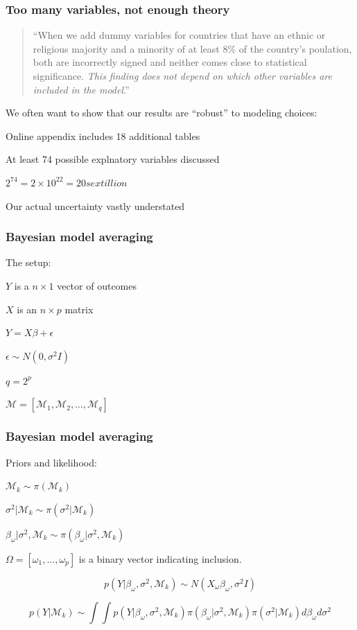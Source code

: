 \documentclass[xcolor=dvipsnames]{beamer}
\begin{document}
\begin{frame}
\frametitle{Too many variables, not enough theory}

\begin{quote}
``When we add dummy variables for countries that have
an ethnic or religious majority and a minority of at least
8\% of the country’s poulation, both are incorrectly signed
and neither comes close to statistical significance. \textit{This
finding does not depend on which other variables are included
in the model}.''
\end{quote}

\vp
We often want to show that our results are ``robust'' to modeling
choices:
\pause
\bis
\item Online appendix includes 18 additional tables
\item At least 74 possible explnatory variables discussed
\item $2^{74}=2\times10^{22}=20 sextillion$
\item Our actual uncertainty vastly understated
\ei

\end{frame}


\begin{frame}
\frametitle{Bayesian model averaging}

The setup:
\bi
\item $Y$ is a $n \times 1$ vector of outcomes
\item $X$ is an $n \times p$ matrix
\item $Y = X\beta + \epsilon$
\item $\epsilon \sim N(0, \sigma^2 I)$
\item $q=2^p$
\item $\mathcal{M}=[\mathcal{M}_1, \mathcal{M}_2,\ldots,\mathcal{M}_q ]$
\ei


\end{frame}


\begin{frame}
\frametitle{Bayesian model averaging}

Priors and likelihood:
\bi
\item $\mathcal{M}_k \sim \pi(\mathcal{M}_k)$
\item $\sigma^2|\mathcal{M}_k \sim \pi(\sigma^2|\mathcal{M}_k)$
\item $\beta_\omega|\sigma^2, \mathcal{M}_k \sim
  \pi(\beta_\omega|\sigma^2, \mathcal{M}_k)$
\item $\Omega=[\omega_1, \ldots, \omega_p]$ is a binary vector
  indicating inclusion.
\ei

\vp \pause
$$p(Y|\beta_\omega, \sigma^2, \mathcal{M}_k) \sim
N(X_\omega\beta_\omega, \sigma^2I) $$

\vp \pause
$$p(Y| \mathcal{M}_k) \sim \int \int  p(Y|\beta_\omega, \sigma^2,
\mathcal{M}_k) \pi(\beta_\omega|\sigma^2, \mathcal{M}_k)
\pi(\sigma^2|\mathcal{M}_k) d\beta_\omega d\sigma^2$$



\end{frame}
\end{document}
